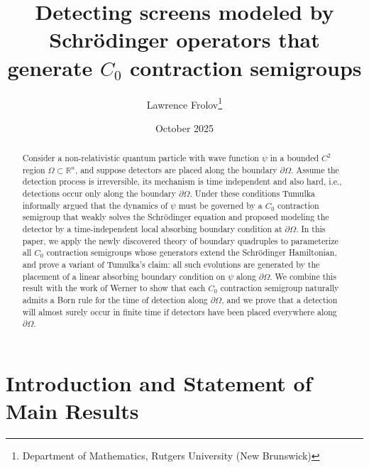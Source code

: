 \documentclass{article}
\title{Detecting screens modeled by Schr\"odinger operators that generate $C_0$ contraction semigroups }
\author{Lawrence Frolov\thanks{Department of Mathematics, Rutgers University (New Brunswick)}
}
\date{October 2025}
\numberwithin{equation}{section}
\begin{document}
\maketitle
\begin{abstract}
    Consider a non-relativistic quantum particle with wave function $\psi$ in a bounded $C^2$ region $\Omega \subset \mathbb{R}^n$, and suppose detectors are placed along the boundary $\partial \Omega$. Assume the detection process is irreversible, its mechanism is time independent and also hard, i.e., detections occur only along the boundary $\partial \Omega$. Under these conditions Tumulka \cite{TUMULKA2022168910} informally argued that the dynamics of $\psi$ must be governed by a $C_0$ contraction semigroup that weakly solves the Schr\"odinger equation and proposed modeling the detector by a time-independent local absorbing boundary condition at $\partial \Omega$. In this paper, we apply the newly discovered theory of boundary quadruples \cite{Arendt2023} to parameterize all $C_0$ contraction semigroups whose generators extend the Schr\"odinger Hamiltonian, and prove a variant of Tumulka's claim: all such evolutions are generated by the placement of a linear absorbing boundary condition on $\psi$ along $\partial \Omega$. We combine this result with the work of Werner \cite{Werner1987} to show that each $C_0$ contraction semigroup naturally admits a Born rule for the time of detection along $\partial \Omega$, and we prove that a detection will almost surely occur in finite time if detectors have been placed everywhere along $\partial \Omega$.
\end{abstract}
\section{Introduction and Statement of Main Results}
\end{document}
